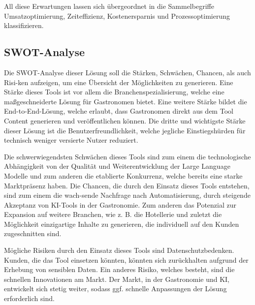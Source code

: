 All diese Erwartungen lassen sich übergeordnet in die Sammelbegriffe Umsatzoptimierung, Zeiteffizienz, Kostenersparnis und Prozessoptimierung klassifizieren.

\subsection{SWOT-Analyse}
Die SWOT-Analyse dieser Lösung soll die Stärken, Schwächen, Chancen, als auch Risi-ken aufzeigen, um eine Übersicht der Möglichkeiten zu generieren.
Eine Stärke dieses Tools ist vor allem die Branchenspezialisierung, welche eine maßgeschneiderte Lösung für Gastronomen bietet.
Eine weitere Stärke bildet die End-to-End-Lösung, welche erlaubt, dass Gastronomen direkt aus dem Tool Content generieren und veröffentlichen können.
Die dritte und wichtigste Stärke dieser Lösung ist die Benutzerfreundlichkeit, welche jegliche Einstiegshürden für technisch weniger versierte Nutzer reduziert.

Die schwerwiegendsten Schwächen dieses Tools sind zum einem die technologische Abhängigkeit von der Qualität und Weiterentwicklung der Large Language Modelle und zum anderen die etablierte Konkurrenz, welche bereits eine starke Marktpräsenz haben.
Die Chancen, die durch den Einsatz dieses Tools entstehen, sind zum einem die wach-sende Nachfrage nach Automatisierung, durch steigende Akzeptanz von KI-Tools in der Gastronomie.
Zum anderen das Potenzial zur Expansion auf weitere Branchen, wie z. B. die Hotellerie und zuletzt die Möglichkeit einzigartige Inhalte zu generieren, die individuell auf den Kunden zugeschnitten sind.

Mögliche Risiken durch den Einsatz dieses Tools sind Datenschutzbedenken.
Kunden, die das Tool einsetzen könnten, könnten sich zurückhalten aufgrund der Erhebung von sensiblen Daten.
Ein anderes Risiko, welches besteht, sind die schnellen Innovationen am Markt.
Der Markt, in der Gastronomie und KI, entwickelt sich stetig weiter, sodass ggf. schnelle Anpassungen der Lösung erforderlich sind.

